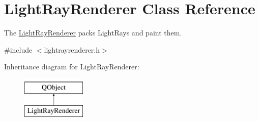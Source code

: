 \hypertarget{class_light_ray_renderer}{}\section{Light\+Ray\+Renderer Class Reference}
\label{class_light_ray_renderer}


The \hyperlink{class_light_ray_renderer}{Light\+Ray\+Renderer} packs Light\+Rays and paint them.  




{\ttfamily \#include $<$lightrayrenderer.\+h$>$}

Inheritance diagram for Light\+Ray\+Renderer\+:\begin{figure}[H]
\begin{center}
\leavevmode
\includegraphics[height=2.000000cm]{class_light_ray_renderer}
\end{center}
\end{figure}

